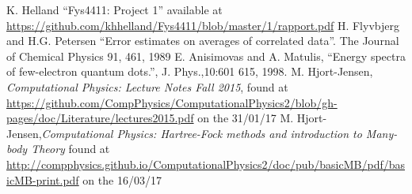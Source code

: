 \documentclass[a4paper,norsk,10pt]{article}
\begin{document}
\begin{thebibliography}{1}

  K. Helland ``Fys4411: Project 1'' available at \url{https://github.com/khhelland/Fys4411/blob/master/1/rapport.pdf}
  H. Flyvbjerg and H.G. Petersen ``Error estimates on averages of correlated data''. The Journal of Chemical Physics 91, 461, 1989
  E. Anisimovas and A. Matulis, ``Energy spectra of few-electron quantum dots.'', J. Phys.,10:601 615, 1998.
  M. Hjort-Jensen, \emph{Computational Physics: Lecture Notes Fall 2015}, found at
  \url{https://github.com/CompPhysics/ComputationalPhysics2/blob/gh-pages/doc/Literature/lectures2015.pdf}
  on the 31/01/17
  M. Hjort-Jensen,\emph{Computational Physics: Hartree-Fock methods and introduction to Many-body Theory}
  found at \url{http://compphysics.github.io/ComputationalPhysics2/doc/pub/basicMB/pdf/basicMB-print.pdf}
  on the 16/03/17
\end{thebibliography}


      
      




\end{document}
